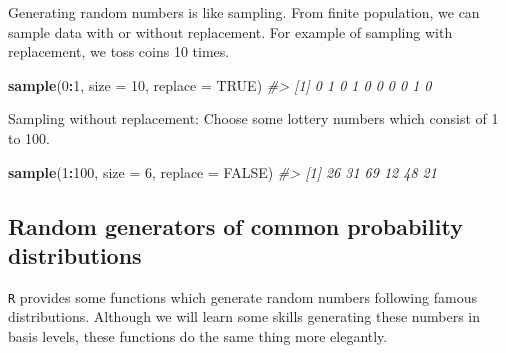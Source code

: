 \documentclass[]{book}
\newenvironment{Shaded}{\begin{snugshade}}{\end{snugshade}}
\newcommand{\CommentTok}[1]{\textcolor[rgb]{0.56,0.35,0.01}{\textit{#1}}}
\newcommand{\DataTypeTok}[1]{\textcolor[rgb]{0.13,0.29,0.53}{#1}}
\newcommand{\DecValTok}[1]{\textcolor[rgb]{0.00,0.00,0.81}{#1}}
\newcommand{\KeywordTok}[1]{\textcolor[rgb]{0.13,0.29,0.53}{\textbf{#1}}}
\newcommand{\NormalTok}[1]{#1}
\newcommand{\OperatorTok}[1]{\textcolor[rgb]{0.81,0.36,0.00}{\textbf{#1}}}
\newcommand{\OtherTok}[1]{\textcolor[rgb]{0.56,0.35,0.01}{#1}}
\theoremstyle{definition}
\theoremstyle{definition}
\theoremstyle{definition}
\theoremstyle{remark}
\begin{document}
Generating random numbers is like sampling. From finite population, we can sample data with or without replacement. For example of sampling with replacement, we toss coins 10 times.

\begin{Shaded}
\begin{Highlighting}[]
\KeywordTok{sample}\NormalTok{(}\DecValTok{0}\OperatorTok{:}\DecValTok{1}\NormalTok{, }\DataTypeTok{size =} \DecValTok{10}\NormalTok{, }\DataTypeTok{replace =} \OtherTok{TRUE}\NormalTok{)}
\CommentTok{#>  [1] 0 1 0 1 0 0 0 0 1 0}
\end{Highlighting}
\end{Shaded}

Sampling without replacement: Choose some lottery numbers which consist of 1 to 100.

\begin{Shaded}
\begin{Highlighting}[]
\KeywordTok{sample}\NormalTok{(}\DecValTok{1}\OperatorTok{:}\DecValTok{100}\NormalTok{, }\DataTypeTok{size =} \DecValTok{6}\NormalTok{, }\DataTypeTok{replace =} \OtherTok{FALSE}\NormalTok{)}
\CommentTok{#> [1] 26 31 69 12 48 21}
\end{Highlighting}
\end{Shaded}

\hypertarget{random-generators-of-common-probability-distributions}{%
\subsection*{Random generators of common probability distributions}\label{random-generators-of-common-probability-distributions}}

\texttt{R} provides some functions which generate random numbers following famous distributions. Although we will learn some skills generating these numbers in basis levels, these functions do the same thing more elegantly.
\end{document}
